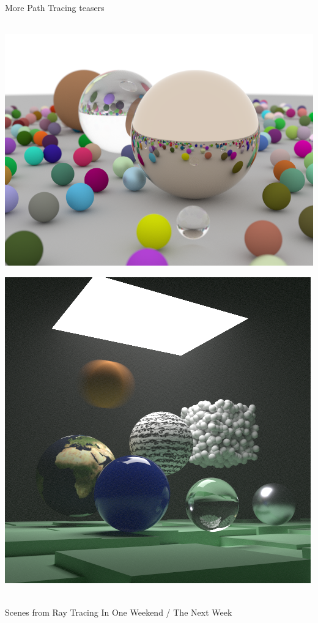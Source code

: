 \documentclass[utf8,stillsansserifmath,fleqn,t]{beamer}
\begin{document}
\begin{frame}
\frametitle{\insertsection}
More Path Tracing teasers\\~\\
\begin{minipage}{.48\textwidth}
\includegraphics[width=\textwidth]{./fig/pt-teaser-rtiow.png}
\end{minipage}\hfill
\begin{minipage}{.48\textwidth}
\includegraphics[width=\textwidth]{./fig/pt-teaser-rttnw.png}
\end{minipage}\\\vfill
Scenes from Ray Tracing In One Weekend / The Next Week
\end{frame}
\end{document}
